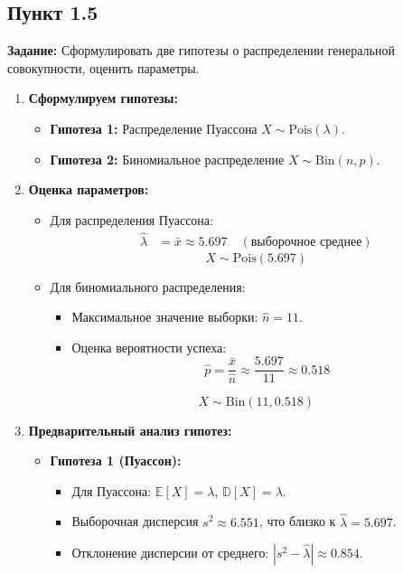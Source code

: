 \documentclass[12pt]{article}
\begin{document}
\subsection*{Пункт 1.5}
\textbf{Задание:} Сформулировать две гипотезы о распределении генеральной совокупности, оценить параметры.

\begin{enumerate}
\item \textbf{Сформулируем гипотезы:}
  \begin{itemize}
      \item \textbf{Гипотеза 1:} Распределение Пуассона $X \sim \text{Pois}(\lambda)$.
      \item \textbf{Гипотеза 2:} Биномиальное распределение $X \sim \text{Bin}(n,p)$.
  \end{itemize}

\item \textbf{Оценка параметров:}  
    \begin{itemize}  
        \item Для распределения Пуассона:  
            \begin{align*}  
                \hat{\lambda} &= \bar{x} \approx 5.697 \quad (\text{выборочное среднее})  
            \end{align*}  
            \[ X \sim \text{Pois}(5.697) \]  

        \item Для биномиального распределения:  
            \begin{itemize}  
                \item Максимальное значение выборки: \( \hat{n} = 11 \).  
                \item Оценка вероятности успеха:  
                    \[  
                        \hat{p} = \frac{\bar{x}}{\hat{n}} \approx \frac{5.697}{11} \approx 0.518  
                    \]  
            \end{itemize}  
            \[ X \sim \text{Bin}(11, 0.518) \]  
    \end{itemize}  

\item \textbf{Предварительный анализ гипотез:}  
    \begin{itemize}  
        \item \textbf{Гипотеза 1 (Пуассон):}  
            \begin{itemize}  
                \item Для Пуассона: \( \mathbb{E}[X] = \lambda \), \( \mathbb{D}[X] = \lambda \).  
                \item Выборочная дисперсия \( s^2 \approx 6.551 \), что близко к \( \hat{\lambda} = 5.697 \).  
                \item Отклонение дисперсии от среднего: \( |s^2 - \hat{\lambda}| \approx 0.854 \).  
            \end{itemize}  


\end{itemize}
\end{enumerate}
\end{document}
